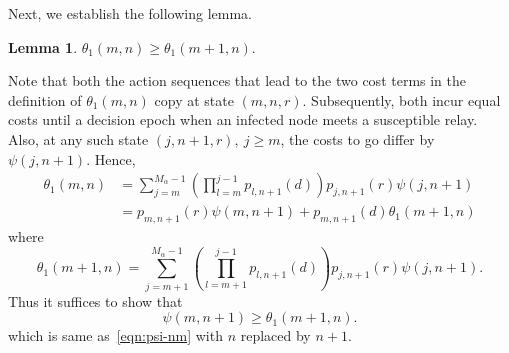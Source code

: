 \documentclass[10pt,journal,letterpaper]{IEEEtran}
\newtheorem{lemma}{Lemma}[section]
\begin{document}
\begin{IEEEproof}
Next, we establish the following lemma.
\begin{lemma}
\label{lma:lemma2}
$\theta_1(m,n) \geq \theta_1(m+1,n).$
\end{lemma}
\begin{IEEEproof}
Note that both the action sequences that lead to the two cost terms in
the definition of $\theta_1(m,n)$ copy at state $(m,n,r)$.
Subsequently, both incur equal costs until a decision epoch when
an infected node meets a susceptible relay. Also, at any such state
$(j,n+1,r),~ j \geq m$, the costs to go differ by $\psi(j,n+1)$.
Hence,
\begin{align*}
\theta_1(m,n) &= \sum_{j = m}^{M_{\alpha}-1}\left(\prod_{l =
m}^{j-1}p_{l,n+1}(d)\right)p_{j,n+1}(r)\psi(j,n+1)\\
 &= p_{m,n+1}(r)\psi(m,n+1) + p_{m,n+1}(d)\theta_1(m+1,n)
\end{align*}
where
\begin{equation*}
\theta_1(m+1,n)= \sum_{j = m+1}^{M_{\alpha}-1}\left(\prod_{l = m+1}^{j-1}p_{l,n+1}(d)\right)p_{j,n+1}(r)\psi(j,n+1).
\end{equation*}
Thus it suffices to show that
\begin{equation*}
\psi(m,n+1) \geq \theta_1(m+1,n).
\end{equation*}
which is same as~\eqref{eqn:psi-nm} with $n$ replaced by $n+1$.
\end{IEEEproof}


\end{IEEEproof}
\end{document}
